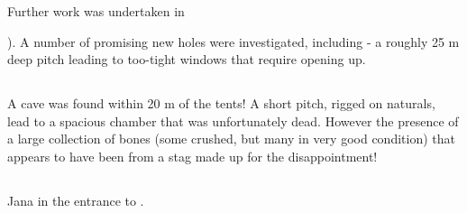 Further work was undertaken in  {). A number of promising new
holes were investigated, including  - a roughly 25 m deep
pitch leading to too-tight windows that require opening up.

\subsection{\protect{}}

A cave was found within 20 m of the tents! A short pitch, rigged on
naturals, lead to a spacious chamber that was unfortunately dead.
However the presence of a large collection of bones (some crushed, but
many in very good condition) that appears to have been from a stag made
up for the disappointment!

\subsection{\protect{}}

\begin{marginfigure}
\caption{Jana in the entrance to . }
\end{marginfigure}

}
